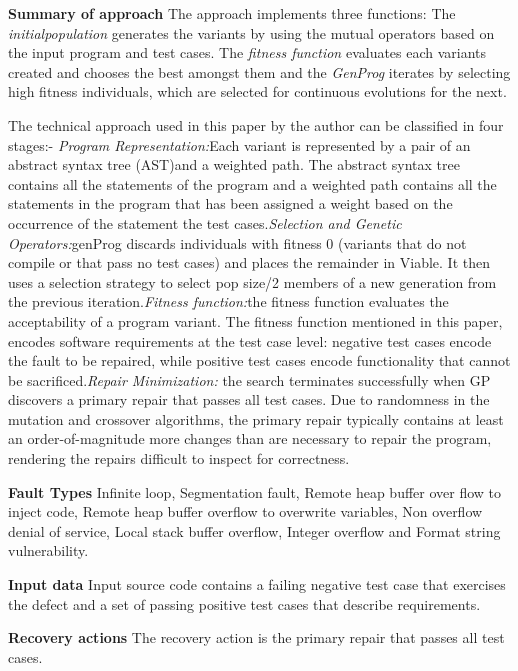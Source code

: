 \begin{compactitem}
\item[\textbf{Summary of approach}] The approach implements three functions: The \textit{initialpopulation} generates the variants by using the mutual operators based on the input program and test cases. The \textit{fitness function} evaluates each variants created and chooses the best amongst them and the \textit{GenProg} iterates by selecting high fitness individuals, which are selected for continuous evolutions for the next.


The technical approach used in this paper by the author can be classified in four stages:-
\textit{Program Representation:}Each variant is represented by a pair of an abstract syntax tree   (AST)and a weighted path. The abstract syntax tree contains all the statements of the program and a weighted path contains all the statements in the program that has been assigned a weight based on the occurrence of the statement the test cases.\textit{Selection and Genetic Operators:}genProg discards individuals with fitness 0 (variants that do not compile or that pass no test cases) and places the remainder in Viable. It then uses a selection strategy to select pop size/2 members of a new generation from the previous iteration.\textit{Fitness function:}the fitness function evaluates the acceptability of a program variant. The fitness function mentioned in this paper, encodes software requirements at the test case level: negative test cases encode the fault to be repaired, while positive test cases encode functionality that cannot be sacrificed.\textit{Repair Minimization:}
the search terminates successfully when GP discovers a primary repair that passes all test cases. Due to randomness in the mutation and crossover algorithms, the primary repair typically contains at least an order-of-magnitude more changes than are necessary to repair the program, rendering the repairs difficult to inspect for correctness.


\item[\textbf{Fault Types}]Infinite loop, Segmentation fault, Remote heap buffer over flow to inject code, Remote heap buffer overflow to overwrite variables, Non overflow denial of service, Local stack buffer overflow, Integer overflow and Format string vulnerability.

\item[\textbf{Input data}] Input source code contains a failing negative test case that exercises the defect and a set of passing positive test cases that describe requirements.

\item[\textbf{Recovery actions}]The recovery action is the primary repair that passes all test cases.


\end{compactitem}
